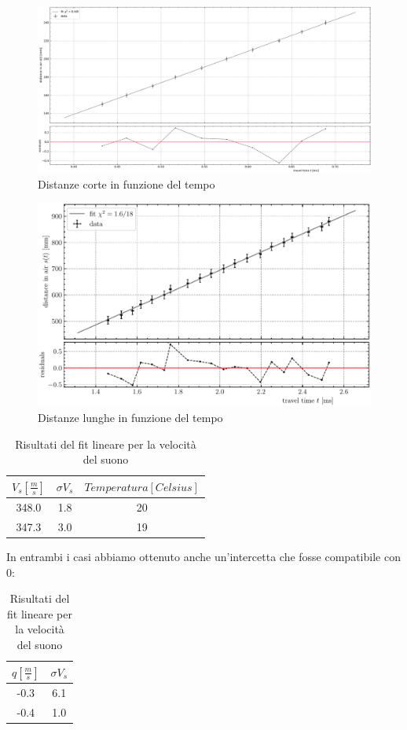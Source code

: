 \documentclass[10pt, a4paper, italian]{article}
\begin{document}
\begin{figure}[htbp]
    \centering
	\includegraphics[width=\textwidth]{2}
    \caption{Distanze corte in funzione del tempo}
\end{figure}
\begin{figure}[htbp]
    \centering
	\includegraphics[width=\textwidth]{railtime}
    \caption{Distanze lunghe in funzione del tempo}
\end{figure}
\begin{table}[htbp]
\centering
\begin{tabular}{cc|c}
\toprule
$V_s [\frac{m}{s}]$& $\sigma V_s$ & $Temperatura [Celsius]$ \\
\midrule
\midrule
348.0 & 1.8 & 20\\
347.3 & 3.0 & 19\\
\bottomrule
\end{tabular}
\caption{Risultati del fit lineare per la velocità del suono}
\end{table}
In entrambi i casi abbiamo ottenuto anche un'intercetta che fosse compatibile con 0:
\begin{table}[htbp]
\centering
\begin{tabular}{cc}
\toprule
$q [\frac{m}{s}]$& $\sigma V_s$ \\
\midrule
-0.3 & 6.1 \\
-0.4 & 1.0 \\
\bottomrule
\end{tabular}
\caption{Risultati del fit lineare per la velocità del suono}
\end{table}
\end{document}
